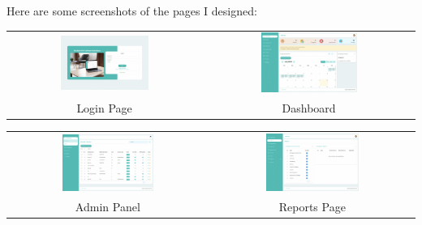 Here are some screenshots of the pages I designed:

\setlength{\tabcolsep}{4pt}

\begin{center}
    \begin{tabular}{cc}
    \includegraphics[width=0.475\textwidth]{images/Chapter4/Evv/login_mid.png} & \includegraphics[width=0.475\textwidth]{images/Chapter4/Evv/dashboard_mid.png} \\
    Login Page & Dashboard \\
    \end{tabular}
\end{center}

\begin{center}
    \begin{tabular}{cc}
    \includegraphics[width=0.475\textwidth]{images/Chapter4/Evv/admin_panel_mid.png} & \includegraphics[width=0.475\textwidth]{images/Chapter4/Evv/report_mid.png} \\
    Admin Panel & Reports Page \\
    \end{tabular}
\end{center}

